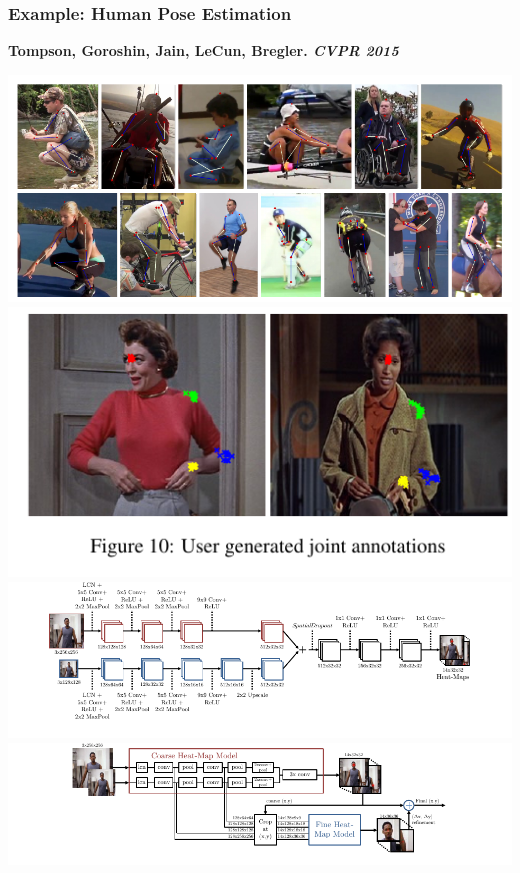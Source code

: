 \documentclass{beamer}
\begin{document}
\begin{frame}
\frametitle{Example: Human Pose Estimation}
\tiny{ \color{blue} \textbf{Tompson, Goroshin, Jain, LeCun, Bregler. \emph{CVPR 2015}}}
\begin{center} 
\includegraphics[scale=0.40]{./Figures/joints.pdf}
\includegraphics[scale=0.40]{./Figures/human.pdf}\\
\includegraphics[scale=0.50]{./Figures/network.pdf}\\
\includegraphics[scale=0.70]{./Figures/network2.pdf}\\
\end{center} 
\end{frame} 
\end{document}
